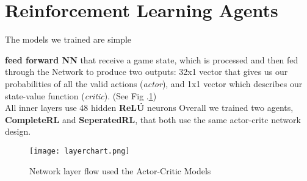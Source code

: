 \section{Reinforcement Learning Agents}
The models we trained are simple {\textbf{feed forward NN} that receive a game state, which is processed and then fed
through the Network to produce two outputs: 32x1 vector that gives us our probabilities of all the valid
actions (\textit{actor}), and 1x1 vector which describes our state-value function (\textit{critic}). (See Fig
.\ref{fig:layerchart})\\
All inner layers use 48 hidden \textbf{ReLÚ} neurons
Overall we trained two agents, \textbf{CompleteRL} and \textbf{SeperatedRL}, that both use the same actor-critc network
design.
\begin{figure}[!h]
\centering
\texttt{[image: layerchart.png]}
\caption{Network layer flow used the Actor-Critic Models}
\label{fig:layerchart}
\end{figure}
}
